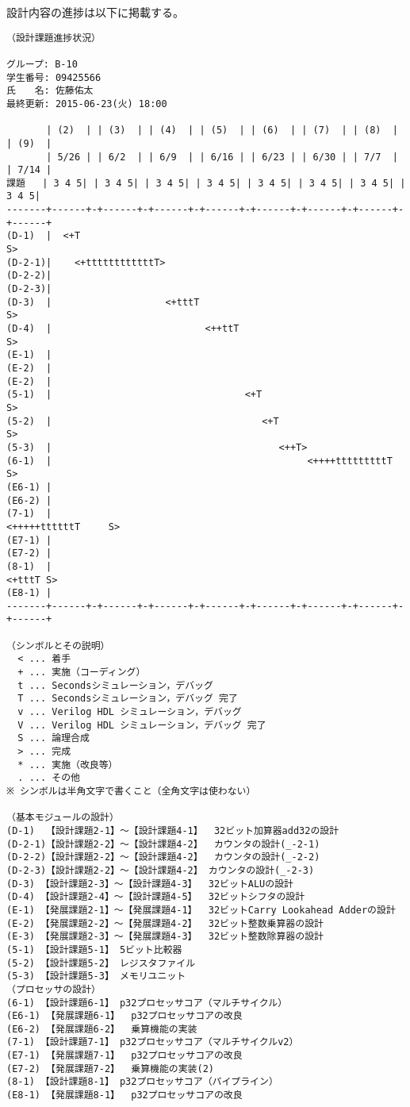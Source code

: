 \documentclass{jarticle}[11pt]
\begin{document}
設計内容の進捗は以下に掲載する。

\begin{verbatim}
（設計課題進捗状況）

グループ: B-10
学生番号: 09425566
氏　　名: 佐藤佑太
最終更新: 2015-06-23(火) 18:00

       | (2)  | | (3)  | | (4)  | | (5)  | | (6)  | | (7)  | | (8)  | | (9)  | 
       | 5/26 | | 6/2  | | 6/9  | | 6/16 | | 6/23 | | 6/30 | | 7/7  | | 7/14 |
課題   | 3 4 5| | 3 4 5| | 3 4 5| | 3 4 5| | 3 4 5| | 3 4 5| | 3 4 5| | 3 4 5|
-------+------+-+------+-+------+-+------+-+------+-+------+-+------+-+------+
(D-1)  |  <+T                                                               S>
(D-2-1)|    <+ttttttttttttT>                                             
(D-2-2)|  
(D-2-3)|  
(D-3)  |                    <+tttT                                          S> 
(D-4)  |                           <++ttT                                   S>
(E-1)  |
(E-2)  |
(E-2)  |
(5-1)  |                                  <+T                                S>
(5-2)  |                                     <+T                             S>
(5-3)  |                                        <++T>                    
(6-1)  |                                             <++++tttttttttT         S>
(E6-1) |
(E6-2) |
(7-1)  |                                                   <+++++ttttttT     S>
(E7-1) |
(E7-2) |
(8-1)  |                                                              <+tttT S>
(E8-1) |
-------+------+-+------+-+------+-+------+-+------+-+------+-+------+-+------+

（シンボルとその説明）
  < ... 着手
  + ... 実施（コーディング）
  t ... Secondsシミュレーション，デバッグ
  T ... Secondsシミュレーション，デバッグ 完了
  v ... Verilog HDL シミュレーション，デバッグ
  V ... Verilog HDL シミュレーション，デバッグ 完了
  S ... 論理合成  
  > ... 完成
  * ... 実施（改良等）
  . ... その他
※ シンボルは半角文字で書くこと（全角文字は使わない）

（基本モジュールの設計）
(D-1)  【設計課題2-1】〜【設計課題4-1】	32ビット加算器add32の設計
(D-2-1)【設計課題2-2】〜【設計課題4-2】	カウンタの設計(_-2-1)
(D-2-2)【設計課題2-2】〜【設計課題4-2】	カウンタの設計(_-2-2)
(D-2-3)【設計課題2-2】〜【設計課題4-2】 カウンタの設計(_-2-3)
(D-3) 【設計課題2-3】〜【設計課題4-3】  32ビットALUの設計
(D-4) 【設計課題2-4】〜【設計課題4-5】  32ビットシフタの設計
(E-1) 【発展課題2-1】〜【発展課題4-1】  32ビットCarry Lookahead Adderの設計
(E-2) 【発展課題2-2】〜【発展課題4-2】  32ビット整数乗算器の設計
(E-3) 【発展課題2-3】〜【発展課題4-3】  32ビット整数除算器の設計
(5-1) 【設計課題5-1】 5ビット比較器
(5-2) 【設計課題5-2】 レジスタファイル
(5-3) 【設計課題5-3】 メモリユニット
（プロセッサの設計）
(6-1) 【設計課題6-1】 p32プロセッサコア（マルチサイクル）
(E6-1) 【発展課題6-1】  p32プロセッサコアの改良
(E6-2) 【発展課題6-2】  乗算機能の実装
(7-1) 【設計課題7-1】 p32プロセッサコア（マルチサイクルv2）
(E7-1) 【発展課題7-1】  p32プロセッサコアの改良
(E7-2) 【発展課題7-2】  乗算機能の実装(2)
(8-1) 【設計課題8-1】 p32プロセッサコア（パイプライン）
(E8-1) 【発展課題8-1】  p32プロセッサコアの改良
\end{verbatim}
\end{document}
